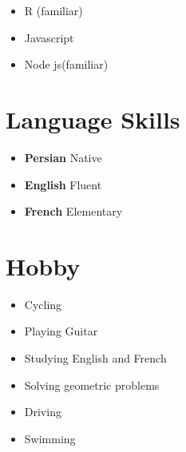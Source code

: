 \documentclass[10pt,a4paper,sans]{moderncv} %
\begin{document}
\begin{cvcolumns}
{\begin{itemize}
\begin{multicols}{2}
\begin{itemize}
\item \textcolor{gray}{Pandas}
\item \textcolor{gray}{Os}
\end{itemize}
\end{multicols}
   \item R (familiar) \item Javascript \item Node js(familiar) \end{itemize}}
\end{cvcolumns}


\section{Language Skills}

\begin{itemize}
\item \textbf{Persian} \hspace{5 pt} Native
\item \textbf{English} \hspace{6 pt} Fluent   
\item \textbf{French} \hspace{6 pt} Elementary  %
\end{itemize} 
\section{Hobby}
\begin{multicols}{2} 
\begin{itemize}
\item Cycling
\item Playing Guitar
\item Studying English and French
\item Solving geometric problems
\item Driving 
\item Swimming
\end{itemize}
\end{multicols}
\end{document}
